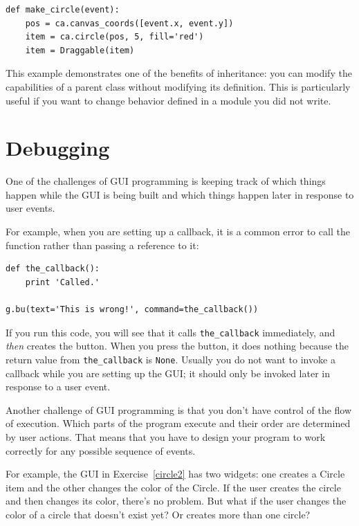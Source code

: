 \documentclass[10pt]{book}
\begin{document}
{\beforeverb
\begin{verbatim}
def make_circle(event):
    pos = ca.canvas_coords([event.x, event.y])
    item = ca.circle(pos, 5, fill='red')
    item = Draggable(item)
\end{verbatim}
\afterverb
%
This example demonstrates one of the benefits of inheritance: you can
modify the capabilities of a parent class without modifying its
definition.  This is particularly useful if you want to change
behavior defined in a module you did not write.


\section{Debugging}

One of the challenges of GUI programming is keeping track of
which things happen while the GUI is being built and which
things happen later in response to user events.


For example, when you are setting up a callback, it is a common error
to call the function rather than passing a reference to it:

\beforeverb
\begin{verbatim}
def the_callback():
    print 'Called.'

g.bu(text='This is wrong!', command=the_callback())
\end{verbatim}
\afterverb
%
If you run this code, you will see that it calls \verb"the_callback"
immediately, and {\em then} creates the button.  When you press the
button, it does nothing because the return value from 
\verb"the_callback" is {\tt None}.
Usually you do not want to invoke a callback while you are
setting up the GUI; it should only be invoked later in response to
a user event.


Another challenge of GUI programming is that you don't have control
of the flow of execution.  Which parts of the program execute
and their order are determined by user actions.
That means that you have to design your program to work correctly
for any possible sequence of events.

For example, the GUI in Exercise~\ref{circle2} has two widgets:
one creates a Circle item and the other changes the color of the
Circle.  If the user creates the circle and then changes its color,
there's no problem.  But what if the user changes the color of
a circle that doesn't exist yet?  Or creates more than one circle?

}
\end{document}
